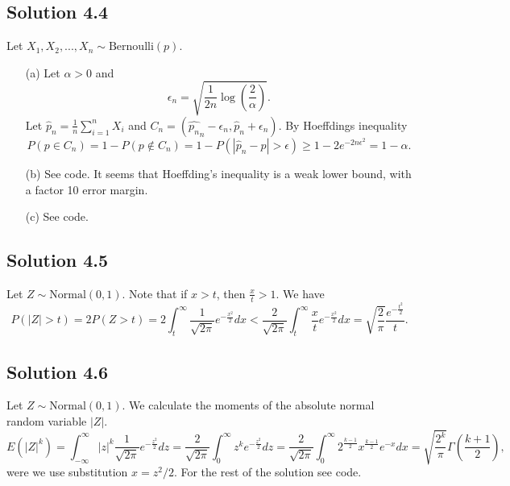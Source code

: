 \subsection*{Solution 4.4}

Let $X_1, X_2, ..., X_n \sim \mathrm{Bernoulli}(p)$.

\begin{itemize}
\item[(a)] Let $\alpha > 0$ and
\begin{equation*}
\epsilon_n = \sqrt{\frac{1}{2n} \log\left(\frac{2}{\alpha}\right)}.
\end{equation*}
Let $\hat{p}_n = \frac{1}{n}\sum_{i=1}^n X_i$ and $C_n = (\hat{p_n}_n - \epsilon_n, \hat{p}_n + \epsilon_n)$.
By Hoeffdings inequality
\begin{equation*}
P(p \in C_n) = 1 - P(p \notin C_n)
    = 1 - P(|\hat{p}_n - p| > \epsilon)
    \geq 1 - 2e^{-2n\epsilon^2}
    = 1 - \alpha.
\end{equation*}
\item[(b)] See code. It seems that Hoeffding's inequality is a weak lower bound, with a factor 10 error margin.
\item[(c)] See code.
\end{itemize}


\subsection*{Solution 4.5}

Let $Z \sim \mathrm{Normal}(0, 1)$.
Note that if $x > t$, then $\frac{x}{t} > 1$.
We have
\begin{equation*}
    P(|Z| > t) = 2P(Z > t)
        = 2 \int_t^{\infty} \frac{1}{\sqrt{2\pi}} e^{-\frac{x^2}{2}} dx
        < \frac{2}{\sqrt{2\pi}} \int_t^{\infty} \frac{x}{t} e^{-\frac{x^2}{2}} dx
        = \sqrt{\frac{2}{\pi}} \frac{e^{-\frac{t^2}{2}}}{t}.
\end{equation*}


\subsection*{Solution 4.6}

Let $Z \sim \mathrm{Normal}(0, 1)$.
We calculate the moments of the absolute normal random variable $|Z|$.
\begin{equation*}
    E(|Z|^k) = \int_{-\infty}^{\infty} |z|^k \frac{1}{\sqrt{2\pi}} e^{-\frac{z^2}{2}} dz
        = \frac{2}{\sqrt{2\pi}} \int_0^{\infty} z^k e^{-\frac{z^2}{2}} dz
        = \frac{2}{\sqrt{2\pi}} \int_0^{\infty} 2^{\frac{k - 1}{2}} x^{\frac{k - 1}{2}} e^{-x} dx
        = \sqrt{\frac{2^{k}}{\pi}} \Gamma\left(\frac{k+1}{2}\right),
\end{equation*}
were we use substitution $x = z^2/2$.
For the rest of the solution see code.



